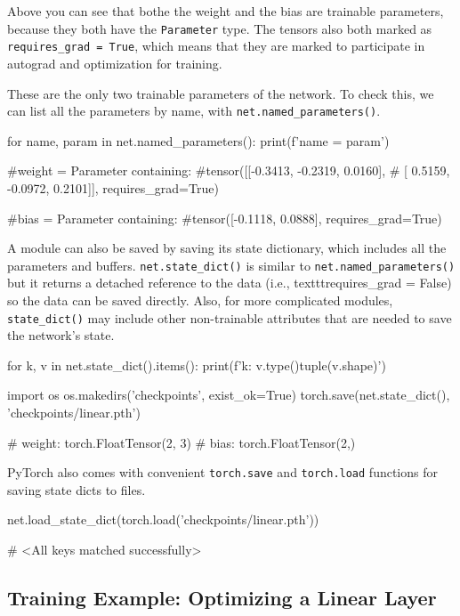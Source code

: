 Above you can see that bothe the weight and the bias are trainable parameters, because they both have the \texttt{Parameter} type. The tensors also both marked as \texttt{requires\_grad = True}, which means that they are marked to participate in autograd and optimization for training. 

These are the only two trainable parameters of the network. To check this, we can list all the parameters by name, with \texttt{net.named\_parameters()}.

\begin{codeblock}[language=python]
for name, param in net.named_parameters():
print(f'{name} = {param}\n')

#weight = Parameter containing:
#tensor([[-0.3413, -0.2319,  0.0160],
#        [ 0.5159, -0.0972,  0.2101]], requires_grad=True)

#bias = Parameter containing:
#tensor([-0.1118,  0.0888], requires_grad=True)
\end{codeblock}

A module can also be saved by saving its state dictionary, which includes all the parameters and buffers. \texttt{net.state\_dict()} is similar to \texttt{net.named\_parameters()} but it returns a detached reference to the data (i.e.,  texttt{requires\_grad = False}) so the data can be saved directly. Also, for more complicated modules, \texttt{state\_dict()} may include other non-trainable attributes that are needed to save the network's state. 

\begin{codeblock}[language=python]
for k, v in net.state_dict().items():
    print(f'{k}: {v.type()}{tuple(v.shape)}')

import os
os.makedirs('checkpoints', exist_ok=True)
torch.save(net.state_dict(), 'checkpoints/linear.pth')

# weight: torch.FloatTensor(2, 3)
# bias: torch.FloatTensor(2,)
\end{codeblock}

PyTorch also comes with convenient \texttt{torch.save} and \texttt{torch.load} functions for saving state dicts to files. 

\begin{codeblock}[language=python]
net.load_state_dict(torch.load('checkpoints/linear.pth'))

# <All keys matched successfully>
\end{codeblock}

\subsection{Training Example: Optimizing a Linear Layer}

